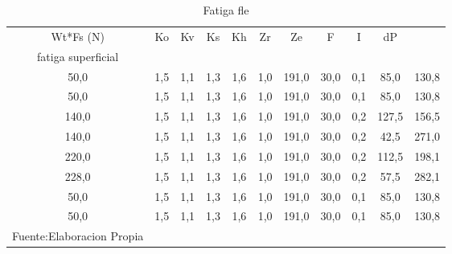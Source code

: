 
\begin{longtable}{|c|c|c|c|c|c|c|c|c|c|c|}
\hline
\rowcolor[HTML]{EFEFEF} 
Wt*Fs (N) & Ko  & Kv  & Ks  & Kh  & Zr  & Ze    & F    & I   & dP    & \begin{tabular}[c]{@{}c@{}}Esfuerzo AGMA \\ fatiga superficial\end{tabular} \\ \hline
50,0      & 1,5 & 1,1 & 1,3 & 1,6 & 1,0 & 191,0 & 30,0 & 0,1 & 85,0  & 130,8                                                                       \\ \hline
50,0      & 1,5 & 1,1 & 1,3 & 1,6 & 1,0 & 191,0 & 30,0 & 0,1 & 85,0  & 130,8                                                                       \\ \hline
140,0     & 1,5 & 1,1 & 1,3 & 1,6 & 1,0 & 191,0 & 30,0 & 0,2 & 127,5 & 156,5                                                                       \\ \hline
140,0     & 1,5 & 1,1 & 1,3 & 1,6 & 1,0 & 191,0 & 30,0 & 0,2 & 42,5  & 271,0                                                                       \\ \hline
220,0     & 1,5 & 1,1 & 1,3 & 1,6 & 1,0 & 191,0 & 30,0 & 0,2 & 112,5 & 198,1                                                                       \\ \hline
228,0     & 1,5 & 1,1 & 1,3 & 1,6 & 1,0 & 191,0 & 30,0 & 0,2 & 57,5  & 282,1                                                                       \\ \hline
50,0      & 1,5 & 1,1 & 1,3 & 1,6 & 1,0 & 191,0 & 30,0 & 0,1 & 85,0  & 130,8                                                                       \\ \hline
50,0      & 1,5 & 1,1 & 1,3 & 1,6 & 1,0 & 191,0 & 30,0 & 0,1 & 85,0  & 130,8                                                                       \\ \hline
\caption{Fatiga fle}{Fuente:Elaboracion Propia}
\label{table:fatiga_flec2}
\end{longtable}
